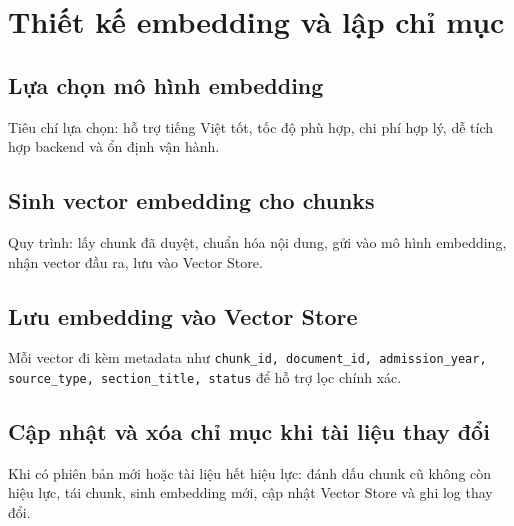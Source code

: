 ﻿\section{Thiết kế embedding và lập chỉ mục}

\subsection{Lựa chọn mô hình embedding}

Tiêu chí lựa chọn: hỗ trợ tiếng Việt tốt, tốc độ phù hợp, chi phí hợp lý, dễ tích hợp backend và ổn định vận hành.

\subsection{Sinh vector embedding cho chunks}

Quy trình: lấy chunk đã duyệt, chuẩn hóa nội dung, gửi vào mô hình embedding, nhận vector đầu ra, lưu vào Vector Store.

\subsection{Lưu embedding vào Vector Store}

Mỗi vector đi kèm metadata như \texttt{chunk\_id, document\_id, admission\_year, source\_type, section\_title, status} để hỗ trợ lọc chính xác.

\subsection{Cập nhật và xóa chỉ mục khi tài liệu thay đổi}

Khi có phiên bản mới hoặc tài liệu hết hiệu lực: đánh dấu chunk cũ không còn hiệu lực, tái chunk, sinh embedding mới, cập nhật Vector Store và ghi log thay đổi.

